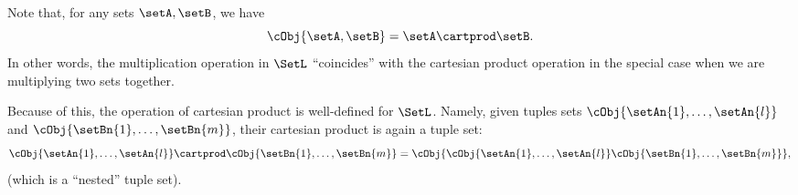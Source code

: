 \begin{remark}
Note that, for any sets $\setA, \setB$, we have 
\begin{equation}
\cObj{\setA, \setB} = \setA \cartprod \setB.
\end{equation}
In other words, the multiplication operation in $\SetL$ ``coincides'' with the cartesian product operation in the special case when we are multiplying two sets together.  

Because of this, the operation of cartesian product is well-defined for $\SetL$. Namely, given tuples sets $\cObj{\setAn{1}, \ldots, \setAn{l}}$ and $\cObj{\setBn{1}, \ldots, \setBn{m}}$, their cartesian product is again a tuple set:
\begin{equation}
\cObj{\setAn{1}, \ldots, \setAn{l}} \cartprod \cObj{\setBn{1}, \ldots, \setBn{m}} = \cObj{\cObj{\setAn{1}, \ldots, \setAn{l}} \cObj{\setBn{1}, \ldots, \setBn{m}}}, 
\end{equation}
(which is a ``nested'' tuple set). 

\end{remark}


